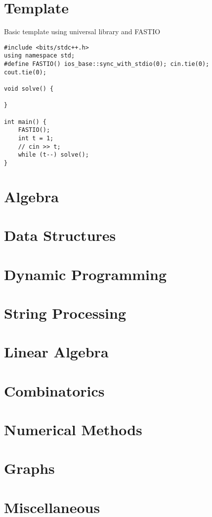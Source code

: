 \section{Template}
Basic template using universal library and FASTIO

\begin{lstlisting}
#include <bits/stdc++.h>
using namespace std;
#define FASTIO() ios_base::sync_with_stdio(0); cin.tie(0); cout.tie(0);

void solve() {
    
}
 
int main() {
    FASTIO();
    int t = 1;
    // cin >> t;
    while (t--) solve();
}   
\end{lstlisting}

\section{Algebra}
\section{Data Structures}
\section{Dynamic Programming}
\section{String Processing}
\section{Linear Algebra}
\section{Combinatorics}
\section{Numerical Methods}
\section{Graphs}
\section{Miscellaneous}
